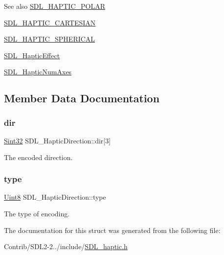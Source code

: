 \begin{DoxySeeAlso}{See also}
\mbox{\hyperlink{_s_d_l__haptic_8h_acdc35e97e5525472054a67b76e518f3b}{S\+D\+L\+\_\+\+H\+A\+P\+T\+I\+C\+\_\+\+P\+O\+L\+AR}} 

\mbox{\hyperlink{_s_d_l__haptic_8h_af8b2430a363a968de2a5b64c8f663d3b}{S\+D\+L\+\_\+\+H\+A\+P\+T\+I\+C\+\_\+\+C\+A\+R\+T\+E\+S\+I\+AN}} 

\mbox{\hyperlink{_s_d_l__haptic_8h_a1fcf7cb0eaf3c39b16ba266054e25aff}{S\+D\+L\+\_\+\+H\+A\+P\+T\+I\+C\+\_\+\+S\+P\+H\+E\+R\+I\+C\+AL}} 

\mbox{\hyperlink{union_s_d_l___haptic_effect}{S\+D\+L\+\_\+\+Haptic\+Effect}} 

\mbox{\hyperlink{_s_d_l__haptic_8h_ad6705645197f6df4eeeea32392462483}{S\+D\+L\+\_\+\+Haptic\+Num\+Axes}} 
\end{DoxySeeAlso}


\subsection{Member Data Documentation}
\mbox{\label{struct_s_d_l___haptic_direction_a6cebd8118a3e61e36bd0c503ae020362}} 
\subsubsection{\texorpdfstring{dir}{dir}}
{\footnotesize\ttfamily \mbox{\hyperlink{_s_d_l__stdinc_8h_a7a90b941db9d4582e9ad7abb9940ff7e}{Sint32}} S\+D\+L\+\_\+\+Haptic\+Direction\+::dir\mbox{[}3\mbox{]}}

The encoded direction. \mbox{\label{struct_s_d_l___haptic_direction_acd6830ad68c4ba2af16057fa418087cc}} 
\subsubsection{\texorpdfstring{type}{type}}
{\footnotesize\ttfamily \mbox{\hyperlink{_s_d_l__stdinc_8h_a2944638813a090aa23e62f4da842c3e2}{Uint8}} S\+D\+L\+\_\+\+Haptic\+Direction\+::type}

The type of encoding. 

The documentation for this struct was generated from the following file\+:\begin{DoxyCompactItemize}
\item 
Contrib/\+S\+D\+L2-\/2../include/\mbox{\hyperlink{_s_d_l__haptic_8h}{S\+D\+L\+\_\+haptic.\+h}}\end{DoxyCompactItemize}
